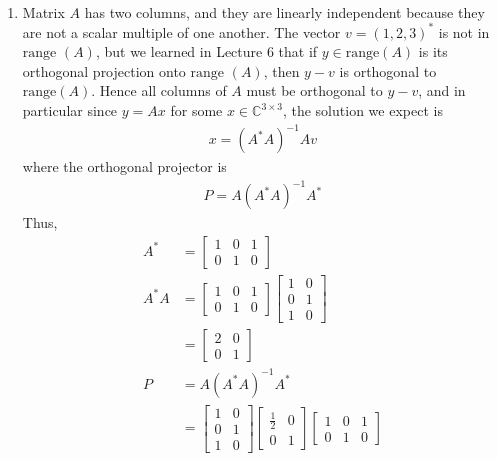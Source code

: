 \documentclass[12pt]{article}
\newenvironment{sol}[1][Solution]{\begin{trivlist}
		\item[\hskip \labelsep {\bfseries #1:}]}{\end{trivlist}}
\begin{document}
\begin{sol}
	\
	\begin{enumerate}[label=(\alph*)]
		\item Matrix $A$ has two columns, and they are linearly independent because they are not a scalar
		multiple of one another. The vector $v=(1,2,3)^*$ is not in $\text{range }(A)$, but we learned in
		Lecture 6 that if $y\in\text{range}(A)$ is its orthogonal projection onto $\text{range }(A)$, then
		$y-v$ is orthogonal to $\text{range}(A)$. Hence all columns of $A$ must be orthogonal to $y-v$,
		and in particular since $y=Ax$ for some $x\in \mathbb{C}^{3\times 3}$, the solution we expect is
		\begin{align*}
			x=(A^*A)^{-1}Av
		\end{align*}
		where the orthogonal projector is
		\begin{align*}
			P=A(A^*A)^{-1}A^*
		\end{align*}
		Thus,
		\begin{align*}
			A^*&=\begin{bmatrix}
				1 & 0 & 1\\
				0 & 1 & 0
			\end{bmatrix}\\
			A^*A&=\begin{bmatrix}
				1 & 0 & 1\\
				0 & 1 & 0
			\end{bmatrix}
			\begin{bmatrix}
				1 & 0\\
				0 & 1\\
				1 & 0
			\end{bmatrix}\\
			&=\begin{bmatrix}
				2 & 0\\
				0 & 1
			\end{bmatrix}\\
			P&=A(A^*A)^{-1}A^*\\
			&=\begin{bmatrix}
				1 & 0 \\
				0 & 1 \\
				1 & 0
			\end{bmatrix}
			\begin{bmatrix}
				\frac{1}{2} & 0\\
				0 & 1
			\end{bmatrix}
			\begin{bmatrix}
				1 & 0 & 1\\
				0 & 1 & 0
			\end{bmatrix}\\

\end{align*}
\end{enumerate}
\end{sol}
\end{document}
